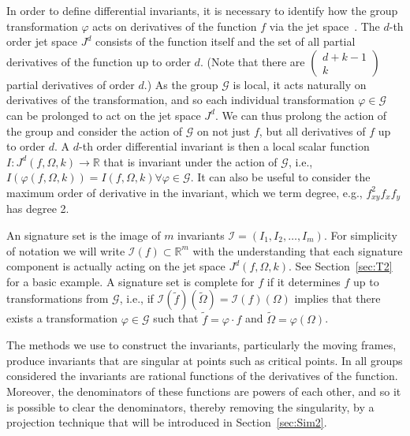 \documentclass[review,onefignum,onetabnum]{siamonline190516}
\begin{document}
In order to define differential invariants, it is necessary to identify how the group transformation $\varphi$ acts on derivatives of the function $f$ via the jet space~\citep{OlverEIS}. The $d$-th order jet space $J^d$ consists of the function itself and the set of all partial derivatives of the function up to order $d$. (Note that there are $\left( \begin{array}{c} d+k-1 \\ k \end{array} \right)$ partial derivatives of order $d$.) As the group $\mathcal{G}$ is local, it acts naturally on derivatives of the transformation, and so each individual transformation $\varphi \in \mathcal{G}$ can be prolonged to act on the jet space $J^d$. We can thus prolong the action of the group and consider the action of $\mathcal{G}$ on not just $f$, but all derivatives of $f$ up to order $d$. A $d$-th order differential invariant is then a local scalar function $I: J^{d} (f,\Omega, k) \to \mathbb{R}$ that is invariant under the action of $\mathcal{G}$, i.e., $I(\varphi(f,\Omega, k)) = I(f, \Omega, k) \forall \varphi \in \mathcal{G}$. It can also be useful to consider the maximum order of derivative in the invariant, which we term degree, e.g., $f_{xy}^2 f_x f_y$ has degree 2. 

An signature set is the image of $m$ invariants
$\mathcal{I}=(I_1,I_2,\dots,I_m)$. For simplicity of notation we will write
$\mathcal{I}(f) \subset \mathbb{R}^m$ with the understanding that each signature component is
actually acting on the jet space $J^d(f, \Omega, k)$. See Section~\ref{sec:T2} for a basic
example. A signature set is complete for $f$ if it determines $f$ up to
transformations from $\mathcal{G}$, i.e., if $\mathcal{I}(\tilde
f)(\tilde\Omega) = \mathcal{I}(f)(\Omega)$ implies that there exists a
transformation $\varphi\in \mathcal{G}$ such that $\tilde f = \varphi\cdot f$
and $\tilde \Omega = \varphi(\Omega)$. 

The methods we use to construct the invariants, particularly the moving frames, produce invariants that are singular at points such as critical points. In all groups considered the invariants are rational functions of the derivatives of the function. Moreover, the denominators of these functions are powers of each other, and so it is possible to clear the denominators, thereby removing the singularity, by a projection technique that will be introduced in Section~\ref{sec:Sim2}.
\end{document}
